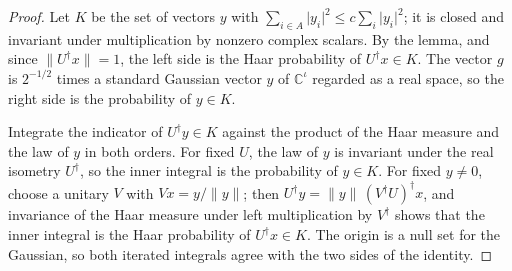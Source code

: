 \begin{proof}
    \leanok
    Let $K$ be the set of vectors $y$ with
    $\sum_{i\in A}\lvert y_i\rvert^2\le c\sum_i\lvert y_i\rvert^2$; it is
    closed and invariant under multiplication by nonzero complex scalars. By
    the lemma, and since $\lVert U^\dagger x\rVert=1$, the left side is the
    Haar probability of $U^\dagger x\in K$. The vector $g$ is $2^{-1/2}$ times
    a standard Gaussian vector $y$ of $\mathbb{C}^\iota$ regarded as a real
    space, so the right side is the probability of $y\in K$.

    Integrate the indicator of $U^\dagger y\in K$ against the product of the
    Haar measure and the law of $y$ in both orders. For fixed $U$, the law of
    $y$ is invariant under the real isometry $U^\dagger$, so the inner integral
    is the probability of $y\in K$. For fixed $y\neq0$, choose a unitary $V$
    with $Vx=y/\lVert y\rVert$; then
    $U^\dagger y=\lVert y\rVert\,(V^\dagger U)^\dagger x$, and invariance of
    the Haar measure under left multiplication by $V^\dagger$ shows that the
    inner integral is the Haar probability of $U^\dagger x\in K$. The origin is
    a null set for the Gaussian, so both iterated integrals agree with the two
    sides of the identity.
\end{proof}
